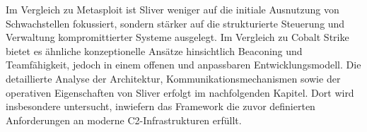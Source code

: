 Im Vergleich zu Metasploit ist Sliver weniger auf die initiale Ausnutzung von Schwachstellen fokussiert, sondern stärker auf die strukturierte Steuerung und Verwaltung kompromittierter Systeme ausgelegt. Im Vergleich zu Cobalt Strike bietet es ähnliche konzeptionelle Ansätze hinsichtlich Beaconing und Teamfähigkeit, jedoch in einem offenen und anpassbaren Entwicklungsmodell.
\newline\newline
Die detaillierte Analyse der Architektur, Kommunikationsmechanismen sowie der operativen Eigenschaften von Sliver erfolgt im nachfolgenden Kapitel. Dort wird insbesondere untersucht, inwiefern das Framework die zuvor definierten Anforderungen an moderne C2-Infrastrukturen erfüllt.